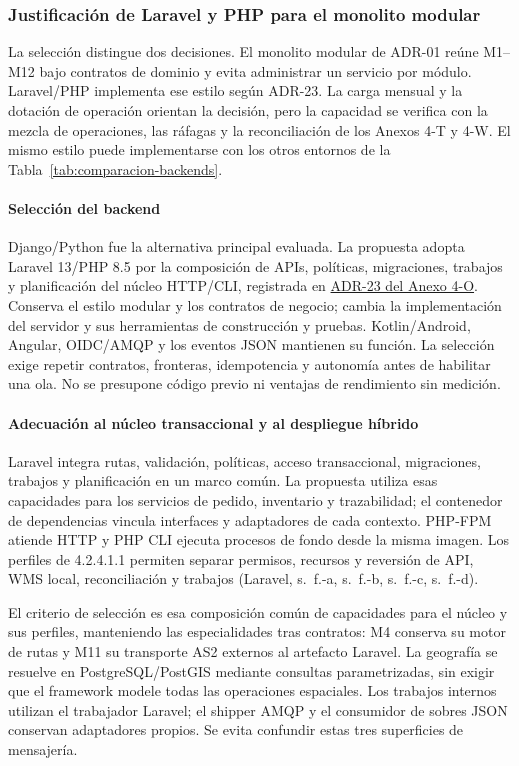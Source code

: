 \subsubsection{Justificación de Laravel y PHP para el monolito modular}
\label{sec:justificacion-backend}

La selección distingue dos decisiones. El monolito modular de ADR-01 reúne M1--M12 bajo contratos de dominio y evita administrar un servicio por módulo. Laravel/PHP implementa ese estilo según ADR-23. La carga mensual y la dotación de operación orientan la decisión, pero la capacidad se verifica con la mezcla de operaciones, las ráfagas y la reconciliación de los Anexos 4-T y 4-W. El mismo estilo puede implementarse con los otros entornos de la Tabla~\ref{tab:comparacion-backends}.

\paragraph{Selección del backend}
Django/Python fue la alternativa principal evaluada. La propuesta adopta Laravel 13/PHP 8.5 por la composición de APIs, políticas, migraciones, trabajos y planificación del núcleo HTTP/CLI, registrada en \href{LAFROX-Subdocumento4-Anexos.pdf#sub:adr-23}{ADR-23 del Anexo 4-O}. Conserva el estilo modular y los contratos de negocio; cambia la implementación del servidor y sus herramientas de construcción y pruebas. Kotlin/Android, Angular, OIDC/AMQP y los eventos JSON mantienen su función. La selección exige repetir contratos, fronteras, idempotencia y autonomía antes de habilitar una ola. No se presupone código previo ni ventajas de rendimiento sin medición.

\paragraph{Adecuación al núcleo transaccional y al despliegue híbrido}
Laravel integra rutas, validación, políticas, acceso transaccional, migraciones, trabajos y planificación en un marco común. La propuesta utiliza esas capacidades para los servicios de pedido, inventario y trazabilidad; el contenedor de dependencias vincula interfaces y adaptadores de cada contexto. PHP-FPM atiende HTTP y PHP CLI ejecuta procesos de fondo desde la misma imagen. Los perfiles de 4.2.4.1.1 permiten separar permisos, recursos y reversión de API, WMS local, reconciliación y trabajos (Laravel, s.~f.-a, s.~f.-b, s.~f.-c, s.~f.-d).

El criterio de selección es esa composición común de capacidades para el núcleo y sus perfiles, manteniendo las especialidades tras contratos: M4 conserva su motor de rutas y M11 su transporte AS2 externos al artefacto Laravel. La geografía se resuelve en PostgreSQL/PostGIS mediante consultas parametrizadas, sin exigir que el framework modele todas las operaciones espaciales. Los trabajos internos utilizan el trabajador Laravel; el shipper AMQP y el consumidor de sobres JSON conservan adaptadores propios. Se evita confundir estas tres superficies de mensajería.

